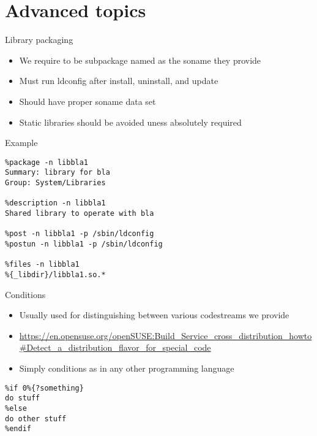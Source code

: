 \documentclass{beamer}
\begin{document}
\section{Advanced topics}

\begin{frame}[t]{Library packaging}
	\begin{itemize}
	\item We require to be subpackage named as the soname they provide
    \item Must run ldconfig after install, uninstall, and update
    \item Should have proper soname data set
    \item Static libraries should be avoided uness absolutely required
	\end{itemize}
\end{frame}

\begin{frame}[fragile]{Example}
	\begin{small}
	\begin{verbatim}
%package -n libbla1
Summary: library for bla
Group: System/Libraries

%description -n libbla1
Shared library to operate with bla

%post -n libbla1 -p /sbin/ldconfig
%postun -n libbla1 -p /sbin/ldconfig

%files -n libbla1
%{_libdir}/libbla1.so.*
	\end{verbatim}
	\end{small}
\end{frame}

\begin{frame}[fragile]{Conditions}
	\begin{itemize}
	\item Usually used for distinguishing between various codestreams we provide
	\item \url{https://en.opensuse.org/openSUSE:Build_Service_cross_distribution_howto#Detect_a_distribution_flavor_for_special_code}
	\item Simply conditions as in any other programming language
	\end{itemize}
	\begin{small}
	\begin{verbatim}
%if 0%{?something}
do stuff
%else
do other stuff
%endif
	\end{verbatim}
	\end{small}
\end{frame}
\end{document}
